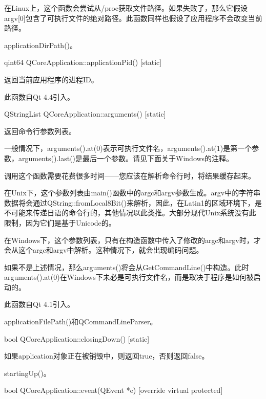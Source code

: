 \begin{warning}
在Linux上，这个函数会尝试从/proc获取文件路径。如果失败了，那么它假设argv[0]包含了可执行文件的绝对路径。此函数同样也假设了应用程序不会改变当前路径。
\end{warning}

\begin{seeAlso}
applicationDirPath()。
\end{seeAlso}

qint64 QCoreApplication::applicationPid() [static]

返回当前应用程序的进程ID。

此函数自Qt 4.4引入。

QStringList QCoreApplication::arguments() [static]

返回命令行参数列表。

一般情况下，arguments().at(0)表示可执行文件名，arguments().at(1)是第一个参数，arguments().last()是最后一个参数。请见下面关于Windows的注释。

调用这个函数需要花费很多时间——您应该在解析命令行时，将结果缓存起来。

\begin{warning}
在Unix下，这个参数列表由main()函数中的argc和argv参数生成。argv中的字符串数据将会通过QString::fromLocal8Bit()来解析，因此，在Latin1的区域环境下，是不可能来传递日语的命令行的，其他情况以此类推。大部分现代Unix系统没有此限制，因为它们是基于Unicode的。
\end{warning}

在Windows下，这个参数列表，只有在构造函数中传入了修改的argc和argv时，才会从这个argc和argv中解析。这种情况下，就会出现编码问题。

如果不是上述情况，那么arguments()将会从GetCommandLine()中构造。此时arguments().at(0)在Windows下未必是可执行文件名，而是取决于程序是如何被启动的。

此函数自Qt 4.1引入。



\begin{seeAlso}
applicationFilePath()和QCommandLineParser。
\end{seeAlso}

bool QCoreApplication::closingDown() [static]

如果application对象正在被销毁中，则返回true，否则返回false。


\begin{seeAlso}
startingUp()。
\end{seeAlso}

bool QCoreApplication::event(QEvent *e) [override virtual protected]

